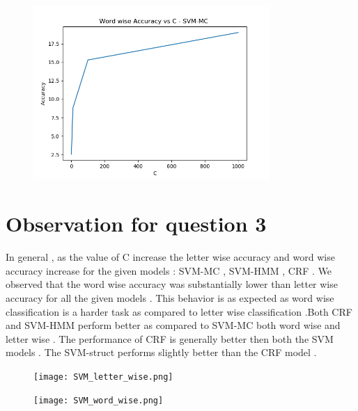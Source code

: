 \documentclass[11pt]{report}
\begin{document}
\begin{figure}[t!]
\begin{minipage}[b]{0.50\textwidth}
\vspace{0.6em} 
\end{minipage} 
~~~ 
\begin{minipage}[b]{0.50\textwidth} 
\centering 	
\vspace{-0.6em} 
\includegraphics[width=9cm]{SVM-MC_word_wise.png}
\vspace{0.6em} 
\end{minipage} 
\end{figure}

\section*{Observation for question 3} 

In general , as the value of C increase the letter wise accuracy and word wise accuracy increase for the given models : SVM-MC , SVM-HMM , CRF .
We observed that the word wise accuracy was substantially lower than letter wise accuracy for all the given models . This behavior is as expected as word wise classification is a harder task as compared 
to letter wise classification .Both CRF and SVM-HMM perform better as compared to SVM-MC both word wise and letter wise . The performance of CRF is generally better then both the SVM models .
The SVM-struct performs slightly better than the CRF model . 

\begin{figure}[t!]
\begin{minipage}[b]{0.50\textwidth}
\centering
\vspace{-0.6em}
\texttt{[image: SVM\_letter\_wise.png]}
\vspace{0.6em}
\end{minipage}

\begin{minipage}[b]{0.50\textwidth}
\centering
\vspace{-0.6em}
\texttt{[image: SVM\_word\_wise.png]}
\vspace{0.6em}
\end{minipage}
\end{figure}
\end{document}
